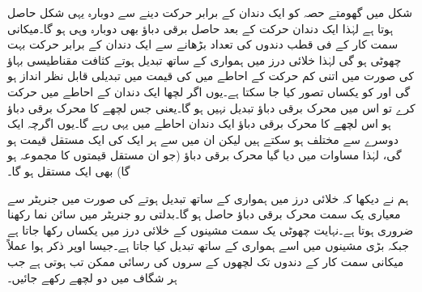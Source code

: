 شکل   میں  گھومتے حصہ کو ایک دندان کے برابر حرکت دینے سے  دوبارہ یہی شکل حاصل ہوتا ہے  لہٰذا ایک دندان حرکت کے بعد حاصل برقی دباؤ بھی دوبارہ وہی ہو گا۔میکانی سمت کار کے فی قطب دندوں کی تعداد بڑھانے  سے ایک دندان کے برابر حرکت بہت چھوٹی ہو گی لہٰذا خلائی درز میں ہمواری کے ساتھ تبدیل ہوتے کثافت مقناطیسی بہاؤ کی صورت میں اتنی کم حرکت کے احاطے میں  کی قیمت میں تبدیلی قابل نظر انداز ہو گی اور  کو یکساں تصور کیا جا سکتا ہے۔یوں اگر لچھا ایک دندان کے احاطے میں حرکت کرے تو اس میں محرک برقی دباؤ تبدیل نہیں ہو گا۔یعنی جس لچھے کا محرک برقی دباؤ   ہو اس لچھے کا  محرک برقی دباؤ ایک دندان احاطے میں یہی رہے گا۔یوں اگرچہ  ایک دوسرے سے مختلف ہو سکتے ہیں لیکن ان میں سے ہر ایک کی ایک مستقل قیمت ہو گی، لہٰذا  مساوات   میں دیا گیا محرک برقی دباؤ (جو ان مستقل قیمتوں کا مجموعہ ہو گا) بھی ایک مستقل ہو گا۔ 


ہم نے دیکھا کہ خلائی درز میں  ہمواری کے ساتھ تبدیل  ہوتے  کی صورت میں جنریٹر سے معیاری یک سمت  محرک برقی دباؤ حاصل ہو گا۔بدلتی  رو جنریٹر میں  سائن نما رکھنا ضروری ہوتا ہے۔نہایت چھوٹی یک سمت  مشینوں کے خلائی درز میں   یکساں رکھا جاتا ہے جبکہ بڑی مشینوں میں اسے ہمواری کے ساتھ تبدیل کیا جاتا ہے۔جیسا اوپر ذکر ہوا عملاً میکانی سمت کار کے دندوں تک لچھوں کے سروں کی رسائی ممکن تب ہوتی ہے جب ہر شگاف میں دو لچھے رکھے جائیں۔

